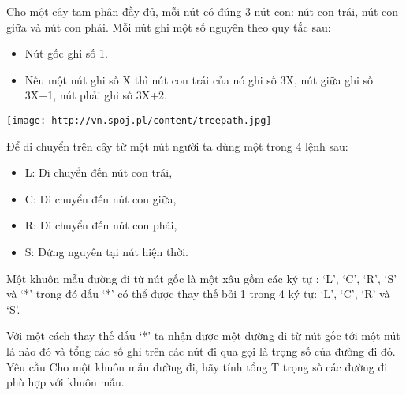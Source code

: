 Cho một cây tam phân đầy đủ, mỗi nút có đúng 3 nút con: nút con trái, nút con giữa và nút con phải. Mỗi nút ghi một số nguyên theo quy tắc sau:  
\begin{itemize}
	\item     Nút gốc ghi số 1.   
	\item     Nếu một nút ghi số X thì nút con trái của nó ghi số 3X, nút giữa ghi số 3X+1, nút phải ghi số 3X+2.   
\end{itemize}
\texttt{[image: http://vn.spoj.pl/content/treepath.jpg]}

   Để di chuyển trên cây từ một nút người ta dùng một trong 4 lệnh sau:  
\begin{itemize}
	\item     L: Di chuyển đến nút con trái,   
	\item     C: Di chuyển đến nút con giữa,   
	\item     R: Di chuyển đến nút con phải,   
	\item     S: Đứng nguyên tại nút hiện thời.   
\end{itemize}

   Một khuôn mẫu đường đi từ nút gốc là một xâu gồm các ký tự : ‘L’, ‘C’, ‘R’, ‘S’ và ‘*’ trong đó dấu ‘*’ có thể được thay thế bởi 1 trong 4 ký tự: ‘L’, ‘C’, ‘R’ và ‘S’.  

   Với một cách thay thế dấu ‘*’ ta nhận được một đường đi từ nút gốc tới một nút lá nào đó và tổng các số ghi trên các nút đi qua gọi là trọng số của đường đi đó.
Yêu cầu
Cho một khuôn mẫu đường đi, hãy tính tổng T trọng số các đường đi phù hợp với khuôn mẫu.